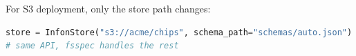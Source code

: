 For S3 deployment, only the store path changes:

\begin{lstlisting}[language=Python]
store = InfonStore("s3://acme/chips", schema_path="schemas/auto.json")
# same API, fsspec handles the rest
\end{lstlisting}
